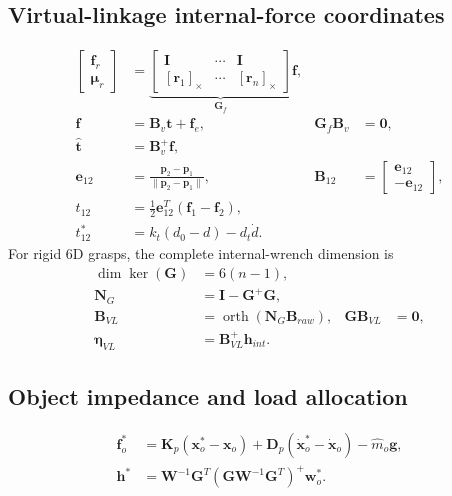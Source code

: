 \documentclass[11pt]{article}
\newcommand{\vect}[1]{\bm{#1}}
\newcommand{\skewm}[1]{[#1]_{\times}}
\newcommand{\pinv}{^{+}}
\begin{document}
\subsection*{Virtual-linkage internal-force coordinates}
\begin{align}
\begin{bmatrix}\vect f_r\\\vect\mu_r\end{bmatrix}
&=\underbrace{\begin{bmatrix}
\vect I&\cdots&\vect I\\
\skewm{\vect r_1}&\cdots&\skewm{\vect r_n}
\end{bmatrix}}_{\vect G_f}\vect f, \tag{VL-02}\\
\vect f&=\vect B_v\vect t+\vect f_e,
&\vect G_f\vect B_v&=\vect0, \tag{VL-03}\\
\hat{\vect t}&=\vect B_v\pinv\vect f, \tag{VL-04}\\
\vect e_{12}&=\frac{\vect p_2-\vect p_1}
{\lVert\vect p_2-\vect p_1\rVert},
&\vect B_{12}&=\begin{bmatrix}\vect e_{12}\\-\vect e_{12}\end{bmatrix}, \tag{VL-05}\\
t_{12}&=\frac12\vect e_{12}^T(\vect f_1-\vect f_2), \tag{VL-06}\\
t_{12}^{*}&=k_t(d_0-d)-d_t\dot d. \tag{VL-07}
\end{align}
For rigid 6D grasps, the complete internal-wrench dimension is
\begin{align}
\dim\ker(\vect G)&=6(n-1), \tag{VL-09}\\
\vect N_G&=\vect I-\vect G\pinv\vect G, \tag{VL-11a}\\
\vect B_{VL}&=\operatorname{orth}(\vect N_G\vect B_{raw}),
&\vect G\vect B_{VL}&=\vect0, \tag{VL-11b}\\
\vect\eta_{VL}&=\vect B_{VL}\pinv\vect h_{int}. \tag{VL-12}
\end{align}

\subsection*{Object impedance and load allocation}
\begin{align}
\vect f_o^*&=\vect K_p(\vect x_o^*-\vect x_o)
+\vect D_p(\dot{\vect x}_o^*-\dot{\vect x}_o)-\hat m_o\vect g, \tag{LOAD-01}\\
\vect h^*&=\vect W^{-1}\vect G^T
(\vect G\vect W^{-1}\vect G^T)\pinv\vect w_o^*. \tag{LOAD-03}
\end{align}
\end{document}
